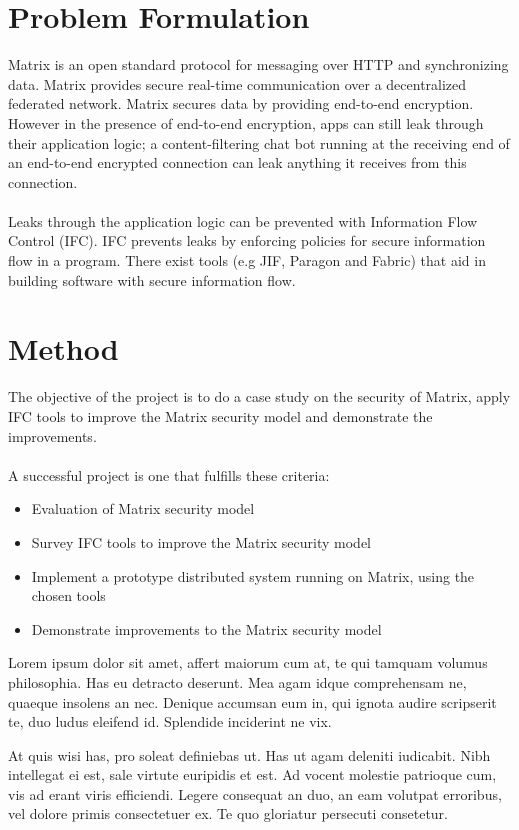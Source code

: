 \section{Problem Formulation} 
Matrix is an open standard protocol for messaging over HTTP and synchronizing data. Matrix provides secure real-time communication over a decentralized federated network. Matrix secures data by providing end-to-end encryption. However in the presence of end-to-end encryption, apps can still leak through their application logic; a content-filtering chat bot running at the receiving end of an end-to-end encrypted connection can leak anything it receives from this connection.
\\
\\
Leaks through the application logic can be prevented with Information Flow Control (IFC). IFC prevents leaks by enforcing policies for secure information flow in a program. There exist tools (e.g JIF, Paragon and Fabric) that aid in building software with secure information flow. 

\section{Method}
The objective of the project is to do a case study on the security of Matrix, apply IFC tools to improve the Matrix security model and demonstrate the improvements.
\\
\\
A successful project is one that fulfills these criteria: 



\begin{itemize}
\item Evaluation of Matrix security model
\item Survey IFC tools to improve the Matrix security model
\item Implement a prototype distributed system running on Matrix, using the chosen tools
\item Demonstrate improvements to the Matrix security model
\end{itemize}   
 
 
 Lorem ipsum dolor sit amet, affert maiorum cum at, te qui tamquam volumus philosophia. Has eu detracto deserunt. Mea agam idque comprehensam ne, quaeque insolens an nec. Denique accumsan eum in, qui ignota audire scripserit te, duo ludus eleifend id. Splendide inciderint ne vix.
 
 At quis wisi has, pro soleat definiebas ut. Has ut agam deleniti iudicabit. Nibh intellegat ei est, sale virtute euripidis et est. Ad vocent molestie patrioque cum, vis ad erant viris efficiendi. Legere consequat an duo, an eam volutpat erroribus, vel dolore primis consectetuer ex. Te quo gloriatur persecuti consetetur.
 
